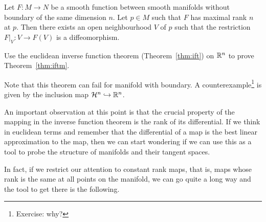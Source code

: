 \begin{theorem}\label{thm:iftm}
  Let $F:M\to N$ be a smooth function between smooth manifolds without boundary of the same dimension $n$.
  Let $p\in M$ such that $F$ has maximal rank $n$ at $p$.
  Then there exists an open neighbourhood $V$ of $p$ such that the restriction $F|_V : V\to F(V)$ is a diffeomorphism.
\end{theorem}
\begin{exercise}
  Use the euclidean inverse function theorem (Theorem~\ref{thm:ift}) on $\mathbb{R}^n$ to prove Theorem~\ref{thm:iftm}.
\end{exercise}

Note that this theorem can fail for manifold with boundary.
A counterexample\footnote{Exercise: why?} is given by the inclusion map $\mathcal{H}^n \hookrightarrow \mathbb{R}^n$. 

An important observation at this point is that the crucial property
of the mapping in the inverse function theorem is the rank of its
differential.
If we think in euclidean terms and remember that the differential of a map
is the best linear approximation to the map, then we can start
wondering if we can use this as a tool to probe the structure of manifolds
and their tangent spaces.

In fact, if we restrict our attention to constant rank maps, that is, maps whose rank is the same at all points on the manifold, we can go quite a long way and the tool to get there is the following.

